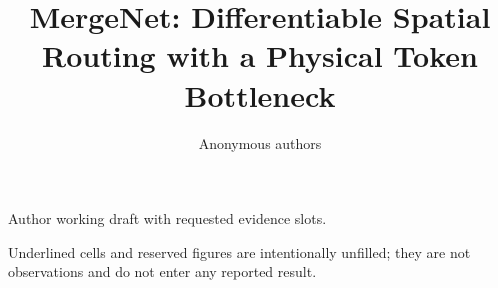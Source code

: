 \documentclass[10pt,a4paper]{article}
\title{MergeNet: Differentiable Spatial Routing with a Physical Token Bottleneck}
\author{Anonymous authors}
\date{}
\begin{document}
\maketitle

\begin{center}\small\color{blue!55!black}
Author working draft with requested evidence slots.\par
Underlined cells and reserved figures are intentionally unfilled; they are
not observations and do not enter any reported result.
\end{center}








\FloatBarrier


\clearpage
\appendix

\clearpage


\end{document}
